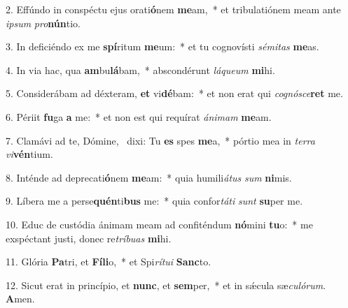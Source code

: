 2. Effúndo in conspéctu ejus orati\textbf{ó}nem \textbf{me}am,~*  et tribulatiónem meam ante \textit{ip}\textit{sum} \textit{pro}\textbf{nún}tio.\

3. In deficiéndo ex me \textbf{spí}ritum \textbf{me}um:~*  et tu cognovísti \textit{sé}\textit{mi}\textit{tas} \textbf{me}as.\

4. In via hac, qua \textbf{am}bu\textbf{lá}bam,~*  abscondérunt \textit{lá}\textit{que}\textit{um} \textbf{mi}hi.\

5. Considerábam ad déxteram, \textbf{et} vi\textbf{dé}bam:~*  et non erat qui \textit{co}\textit{gnó}\textit{sce}\textbf{ret} me.\

6. Périit \textbf{fu}ga \textbf{a} me:~*  et non est qui requírat \textit{á}\textit{ni}\textit{mam} \textbf{me}am.\

7. Clamávi ad te, Dómine, \dag\  dixi: Tu \textbf{es} spes \textbf{me}a,~*  pórtio mea in \textit{ter}\textit{ra} \textit{vi}\textbf{vén}tium.\

8. Inténde ad deprecati\textbf{ó}nem \textbf{me}am:~*  quia humili\textit{á}\textit{tus} \textit{sum} \textbf{ni}mis.\

9. Líbera me a perse\textbf{quén}ti\textbf{bus} me:~*  quia confor\textit{tá}\textit{ti} \textit{sunt} \textbf{su}per me.\

10. Educ de custódia ánimam meam ad confiténdum \textbf{nó}mini \textbf{tu}o:~*  me exspéctant justi, donec re\textit{trí}\textit{bu}\textit{as} \textbf{mi}hi.\

11. Glória \textbf{Pa}tri, et \textbf{Fí}\textbf{li}o,~*  et Spi\textit{rí}\textit{tu}\textit{i} \textbf{Sanc}to.\

12. Sicut erat in princípio, et \textbf{nunc}, et \textbf{sem}per,~*  et in sǽcula sæ\textit{cu}\textit{ló}\textit{rum}. \textbf{A}men.\


